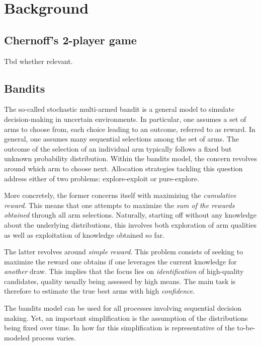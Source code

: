 \chapter{Background}\label{chapter:background}

\section{Chernoff's 2-player game}
Tbd whether relevant.

\section{Bandits}
The so-called stochastic multi-armed bandit is a general model to simulate
decision-making in uncertain environments. In particular, one assumes a set of
arms to choose from, each choice leading to an outcome, referred
to as reward. In general, one assumes many sequential selections among the set
of arms. The outcome of the selection of an individual arm typically follows a
fixed but unknown probability distribution.
Within the bandits model, the concern revolves around which arm to choose next.
Allocation strategies tackling this question address either of two problems:
explore-exploit or pure-explore.

More concretely, the former concerns itself with maximizing the \emph{cumulative
reward}. This means that one attempts to maximize the \emph{sum of the rewards
obtained} through all arm selections. Naturally, starting off without any
knowledge about the underlying distributions, this involves both exploration of
arm qualities as well as exploitation of knowledge obtained so far.

The latter revolves around \emph{simple reward}. This problem consists of
seeking to maximize the reward one obtains if one leverages the current
knowledge for \emph{another} draw. This implies that the focus lies on
\emph{identification} of high-quality candidates, quality usually being assessed
by high means. The main task is therefore to estimate the true best arms
with high \emph{confidence}.

The bandits model can be used for all processes involving sequential decision
making. Yet, an important simplification is the assumption of the distributions
being fixed over time. In how far this simplification is representative of the
to-be-modeled process varies.

